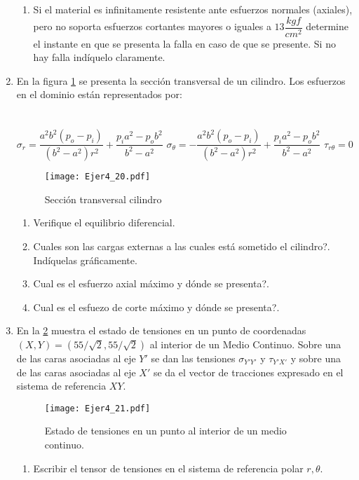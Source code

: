 \documentclass[../notas medios.tex]{subfiles}
\begin{document}
\begin{enumerate}
\begin{enumerate}
	\item Si el material es infinitamente resistente ante esfuerzos normales (axiales), pero no soporta esfuerzos cortantes mayores o iguales a $13\dfrac{kgf}{cm^2}$ determine el instante en que se presenta la falla en caso de que se presente. Si no hay falla ind\'iquelo claramente.
\end{enumerate}
\item \label{punto20} En la figura \ref{dona} se presenta la secci\'on
transversal de un cilindro. Los esfuerzos en el dominio est\'an representados por:\\\\
	\\
	$\sigma_{r} = \dfrac{a^2 b^2 (p_o-p_i)}{(b^2-a^2)r^2} + \dfrac{p_i a^2 - p_o b^2}{b^2-a^2}$ \hspace{5mm}
	$\sigma_{\theta} = -\dfrac{a^2 b^2 (p_o-p_i)}{(b^2-a^2)r^2} + \dfrac{p_i a^2 - p_o b^2}{b^2-a^2}$\hspace{5mm}
	$\tau_{r \theta} = 0$ 
	\begin{figure}[H]
		\centering
		\texttt{[image: Ejer4\_20.pdf]} 
		\caption{Secci\'on transversal cilindro}
		\label{dona}
	\end{figure}
	\begin{enumerate}
		\item Verifique el equilibrio diferencial.
		\item \textquestiondown Cuales son las cargas externas a las cuales est\'a sometido el cilindro?. Indíquelas gr\'aficamente.
		\item \textquestiondown Cual es el esfuerzo axial m\'aximo y d\'onde se presenta?.
		\item \textquestiondown Cual es el esfuezo de corte m\'aximo y d\'onde se presenta?.
	\end{enumerate}
%
\item \label{punto21} En la \cref{PtoPol} muestra el estado de tensiones en un punto de coordenadas $(X,Y) = (55/\sqrt{2},55/\sqrt{2})$  al interior de un Medio Continuo. Sobre una de las caras asociadas al eje $Y'$ se dan las tensiones $\sigma_{Y'Y'}$ y $\tau_{Y'X'}$ y sobre una de las caras asociadas al eje $X'$ se da el vector de tracciones expresado en el sistema de referencia $XY$.
%
\begin{figure}[H]
	\centering
	\texttt{[image: Ejer4\_21.pdf]} 
	\caption{Estado de tensiones en un punto al interior de un medio continuo.}
	\label{PtoPol}
\end{figure}
%
\begin{enumerate}
	\item Escribir el tensor de tensiones en el sistema de referencia polar $r,\theta$. \\
\end{enumerate}



\end{enumerate}
\end{document}
